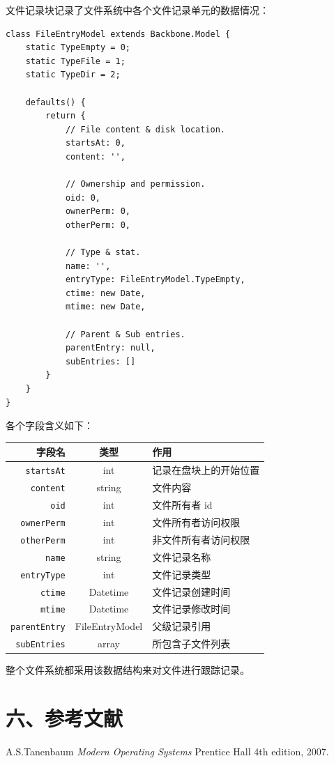 \documentclass[12bp]{guo}
\begin{document}
文件记录块记录了文件系统中各个文件记录单元的数据情况：

\begin{verbatim}
class FileEntryModel extends Backbone.Model {
    static TypeEmpty = 0;
    static TypeFile = 1;
    static TypeDir = 2;

    defaults() {
        return {
            // File content & disk location.
            startsAt: 0,
            content: '',

            // Ownership and permission.
            oid: 0,
            ownerPerm: 0,
            otherPerm: 0,

            // Type & stat.
            name: '',
            entryType: FileEntryModel.TypeEmpty,
            ctime: new Date,
            mtime: new Date,

            // Parent & Sub entries.
            parentEntry: null,
            subEntries: []
        }
    }
}
\end{verbatim}

各个字段含义如下：

\begin{table}[H]
    \centering
    \begin{tabular}{| r | c | l |}
        \hline
        字段名 & 类型 & 作用 \\ \hline
        \texttt{startsAt} & int & 记录在盘块上的开始位置 \\
        \texttt{content} & string & 文件内容 \\
        \texttt{oid} & int & 文件所有者 id \\
        \texttt{ownerPerm} & int & 文件所有者访问权限 \\
        \texttt{otherPerm} & int & 非文件所有者访问权限 \\
        \texttt{name} & string & 文件记录名称 \\
        \texttt{entryType} & int & 文件记录类型 \\
        \texttt{ctime} & Datetime & 文件记录创建时间 \\
        \texttt{mtime} & Datetime & 文件记录修改时间 \\
        \texttt{parentEntry} & FileEntryModel  & 父级记录引用 \\
        \texttt{subEntries} & array & 所包含子文件列表 \\ \hline
    \end{tabular}
\end{table}

整个文件系统都采用该数据结构来对文件进行跟踪记录。

\section{六、参考文献}
\begin{thebibliography}{8}
    A.S.Tanenbaum
    \emph{Modern Operating Systems}
    Prentice Hall
    4th edition,
    2007.
\end{thebibliography}
\end{document}
